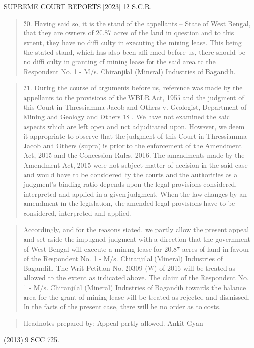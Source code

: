 \documentclass[12pt,a4paper]{article}
\newenvironment{judgequote}
  {\begin{quote}\small}
  {\end{quote}}
\begin{document}

 SUPREME COURT REPORTS [2023] 12 S.C.R.


\begin{judgequote}
20. Having said so, it is the stand of the appellants -- State of West
Bengal, that they are owners of 20.87 acres of the land in question and to
this extent, they have no diffi culty in executing the mining lease. This being
the stated stand, which has also been affi rmed before us, there should be
no diffi culty in granting of mining lease for the said area to the Respondent
No. 1 - M/s. Chiranjilal (Mineral) Industries of Bagandih.
\end{judgequote}

\begin{judgequote}
21. During the course of arguments before us, reference was made by
the appellants to the provisions of the WBLR Act, 1955 and the judgment
of this Court in Thressiamma Jacob and Others v. Geologist, Department
of Mining and Geology and Others 18 . We have not examined the said
aspects which are left open and not adjudicated upon. However, we deem
it appropriate to observe that the judgment of this Court in Thressiamma
Jacob and Others (supra) is prior to the enforcement of the Amendment
Act, 2015 and the Concession Rules, 2016. The amendments made by
the Amendment Act, 2015 were not subject matter of decision in the said
case and would have to be considered by the courts and the authorities as
a judgment's binding ratio depends upon the legal provisions considered,
interpreted and applied in a given judgment. When the law changes by
an amendment in the legislation, the amended legal provisions have to be
considered, interpreted and applied.
\end{judgequote}

\begin{judgequote}
Accordingly, and for the reasons stated, we partly allow the present
appeal and set aside the impugned judgment with a direction that the
government of West Bengal will execute a mining lease for 20.87 acres of
land in favour of the Respondent No. 1 - M/s. Chiranjilal (Mineral) Industries
of Bagandih. The Writ Petition No. 20309 (W) of 2016 will be treated as
allowed to the extent as indicated above. The claim of the Respondent No.
1 - M/s. Chiranjilal (Mineral) Industries of Bagandih towards the balance
area for the grant of mining lease will be treated as rejected and dismissed.
In the facts of the present case, there will be no order as to costs.
\end{judgequote}

\begin{judgequote}
Headnotes prepared by: Appeal partly allowed.
Ankit Gyan
\end{judgequote}

 (2013) 9 SCC 725.
\end{document}
